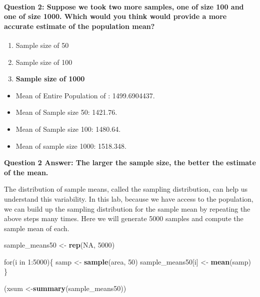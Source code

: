 \documentclass[]{article}
\newenvironment{Shaded}{\begin{snugshade}}{\end{snugshade}}
\newcommand{\KeywordTok}[1]{\textcolor[rgb]{0.13,0.29,0.53}{\textbf{{#1}}}}
\newcommand{\DecValTok}[1]{\textcolor[rgb]{0.00,0.00,0.81}{{#1}}}
\newcommand{\StringTok}[1]{\textcolor[rgb]{0.31,0.60,0.02}{{#1}}}
\newcommand{\OtherTok}[1]{\textcolor[rgb]{0.56,0.35,0.01}{{#1}}}
\newcommand{\NormalTok}[1]{{#1}}
\begin{document}
\paragraph{Question 2: Suppose we took two more samples, one of size 100
and one of size 1000. Which would you think would provide a more
accurate estimate of the population
mean?}\label{question-2-suppose-we-took-two-more-samples-one-of-size-100-and-one-of-size-1000.-which-would-you-think-would-provide-a-more-accurate-estimate-of-the-population-mean}

\begin{enumerate}
\def\labelenumi{\Alph{enumi})}
\itemsep1pt\parskip0pt
\item
  Sample size of 50
\item
  Sample size of 100
\item
  \textbf{Sample size of 1000}
\end{enumerate}

\begin{itemize}
\itemsep1pt\parskip0pt
\item
  Mean of Entire Population of : 1499.6904437.
\item
  Mean of Sample size 50: 1421.76.
\item
  Mean of Sample size 100: 1480.64.
\item
  Mean of sample size 1000: 1518.348.
\end{itemize}

\textbf{Question 2 Answer: The larger the sample size, the better the
estimate of the mean.}

The distribution of sample means, called the sampling distribution, can
help us understand this variability. In this lab, because we have access
to the population, we can build up the sampling distribution for the
sample mean by repeating the above steps many times. Here we will
generate 5000 samples and compute the sample mean of each.

\begin{Shaded}
\begin{Highlighting}[]
\NormalTok{sample_means50 <-}\StringTok{ }\KeywordTok{rep}\NormalTok{(}\OtherTok{NA}\NormalTok{, }\DecValTok{5000}\NormalTok{)}

\NormalTok{for(i in }\DecValTok{1}\NormalTok{:}\DecValTok{5000}\NormalTok{)\{}
   \NormalTok{samp <-}\StringTok{ }\KeywordTok{sample}\NormalTok{(area, }\DecValTok{50}\NormalTok{)}
   \NormalTok{sample_means50[i] <-}\StringTok{ }\KeywordTok{mean}\NormalTok{(samp)}
   \NormalTok{\}}

\NormalTok{(xsum <-}\KeywordTok{summary}\NormalTok{(sample_means50))}
\end{Highlighting}
\end{Shaded}
\end{document}
